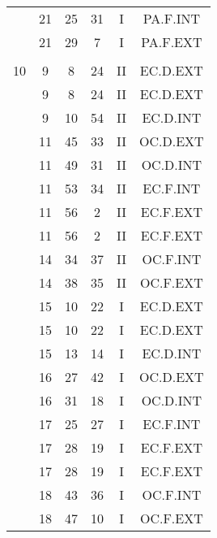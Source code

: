\documentclass[12pt, a4paper]{article}
\begin{document}
\begin{multicols}{3}
{\begin{tabular}{c c c c c c}
	 	 	 	 & 21 & 25 & 31 & I & PA.F.INT\\%
	 	 	 	 & 21 & 29 & 7 & I & PA.F.EXT\\%
	 	 	 	 & & & & & \\%
	 	 	 	10 & 9 & 8 & 24 & II & EC.D.EXT\\%
	 	 	 	 & 9 & 8 & 24 & II & EC.D.EXT\\%
	 	 	 	 & 9 & 10 & 54 & II & EC.D.INT\\%
	 	 	 	 & 11 & 45 & 33 & II & OC.D.EXT\\%
	 	 	 	 & 11 & 49 & 31 & II & OC.D.INT\\%
	 	 	 	 & 11 & 53 & 34 & II & EC.F.INT\\%
	 	 	 	 & 11 & 56 & 2 & II & EC.F.EXT\\%
	 	 	 	 & 11 & 56 & 2 & II & EC.F.EXT\\%
	 	 	 	 & 14 & 34 & 37 & II & OC.F.INT\\%
	 	 	 	 & 14 & 38 & 35 & II & OC.F.EXT\\%
	 	 	 	 & 15 & 10 & 22 & I & EC.D.EXT\\%
	 	 	 	 & 15 & 10 & 22 & I & EC.D.EXT\\%
	 	 	 	 & 15 & 13 & 14 & I & EC.D.INT\\%
	 	 	 	 & 16 & 27 & 42 & I & OC.D.EXT\\%
	 	 	 	 & 16 & 31 & 18 & I & OC.D.INT\\%
	 	 	 	 & 17 & 25 & 27 & I & EC.F.INT\\%
	 	 	 	 & 17 & 28 & 19 & I & EC.F.EXT\\%
	 	 	 	 & 17 & 28 & 19 & I & EC.F.EXT\\%
	 	 	 	 & 18 & 43 & 36 & I & OC.F.INT\\%
	 	 	 	 & 18 & 47 & 10 & I & OC.F.EXT\\%

\end{tabular}}
\end{multicols}
\end{document}
